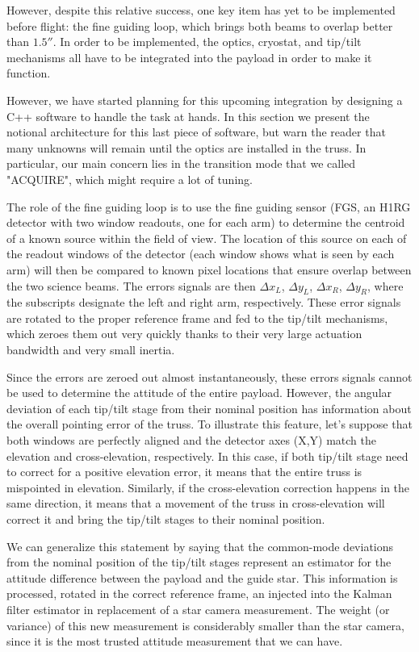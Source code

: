 However, despite this relative success, one key item has yet to be implemented before flight: the fine guiding loop, which brings both beams to overlap better than $\ang{;;1.5}$. In order to be implemented, the optics, cryostat, and tip/tilt mechanisms all have to be integrated into the payload in order to make it function.

However, we have started planning for this upcoming integration by designing a C++ software to handle the task at hands. In this section we present the notional architecture for this last piece of software, but warn the reader that many unknowns will remain until the optics are installed in the truss. In particular, our main concern lies in the transition mode that we called "ACQUIRE", which might require a lot of tuning. 

The role of the fine guiding loop is to use the fine guiding sensor (FGS, an H1RG detector with two window readouts, one for each arm) to determine the centroid of a known source within the field of view. The location of this source on each of the readout windows of the detector (each window shows what is seen by each arm) will then be compared to known pixel locations that ensure overlap between the two science beams. The errors signals are then $\Delta x_L$, $\Delta y_L$, $\Delta x_R$, $\Delta y_R$, where the subscripts designate the left and right arm, respectively. These error signals are rotated to the proper reference frame and fed to the tip/tilt mechanisms, which zeroes them out very quickly thanks to their very large actuation bandwidth and very small inertia. 

Since the errors are zeroed out almost instantaneously, these errors signals cannot be used to determine the attitude of the entire payload. However, the angular deviation of each tip/tilt stage from their nominal position has information about the overall pointing error of the truss. To illustrate this feature, let's suppose that both windows are perfectly aligned and the detector axes (X,Y) match the elevation and cross-elevation, respectively. In this case, if both tip/tilt stage need to correct for a positive elevation error, it means that the entire truss is mispointed in elevation. Similarly, if the cross-elevation correction happens in the same direction, it means that a movement of the truss in cross-elevation will correct it and bring the tip/tilt stages to their nominal position.

We can generalize this statement by saying that the common-mode deviations from the nominal position of the tip/tilt stages represent an estimator for the attitude difference between the payload and the guide star. This information is processed, rotated in the correct reference frame, an injected into the Kalman filter estimator in replacement of a star camera measurement. The weight (or variance) of this new measurement is considerably smaller than the star camera, since it is the most trusted attitude measurement that we can have. 

